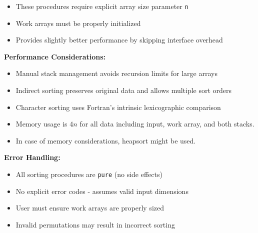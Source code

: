 \begin{enumerate}
\begin{enumerate}
                  \begin{itemize}
                    \item These procedures require explicit array size parameter \texttt{n}
                          
                    \item Work arrays must be properly initialized
                          
                    \item Provides slightly better performance by skipping interface overhead
                  \end{itemize}
          \end{enumerate}
          
          \textbf{Performance Considerations:}
          \begin{itemize}
            \item Manual stack management avoids recursion limits for large arrays
                  
            \item Indirect sorting preserves original data and allows multiple sort orders
                  
            \item Character sorting uses Fortran's intrinsic lexicographic comparison
                  
            \item Memory usage is $4n$ for all data including input, work array, and
                  both stacks.
                  
            \item In case of memory considerations, heapsort might be used.
          \end{itemize}
          
          \textbf{Error Handling:}
          \begin{itemize}
            \item All sorting procedures are \texttt{pure} (no side effects)
                  
            \item No explicit error codes - assumes valid input dimensions
                  
            \item User must ensure work arrays are properly sized
                  
            \item Invalid permutations may result in incorrect sorting
          \end{itemize}
\end{enumerate}